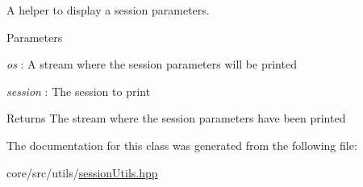 A helper to display a session parameters. 


\begin{DoxyParams}{Parameters}
\item[{\em os}]: A stream where the session parameters will be printed \item[{\em session}]: The session to print \end{DoxyParams}
\begin{DoxyReturn}{Returns}
The stream where the session parameters have been printed 
\end{DoxyReturn}


The documentation for this class was generated from the following file:\begin{DoxyCompactItemize}
\item 
core/src/utils/\hyperlink{sessionUtils_8hpp}{sessionUtils.hpp}\end{DoxyCompactItemize}
